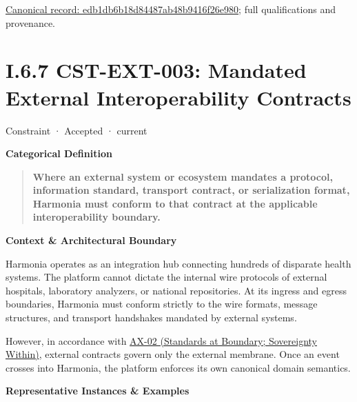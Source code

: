 {\footnotesize \href{../../../../continuum/motivation/constraint/edb1db6b18d84487ab48b9416f26e980.md}{Canonical record: edb1db6b18d84487ab48b9416f26e980}; full qualifications and provenance.}\par
\section*{I.6.7 CST-EXT-003: Mandated External Interoperability Contracts}
\label{navigation:I.6.7}

\label{element:cad6d41364ef4bb1ae0a2a519db11da4}
{\small Constraint · Accepted · current}\par

\par\medskip\textbf{Categorical Definition}\par


\begin{quote}


\textbf{Where an external system or ecosystem mandates a protocol, information standard, transport contract, or serialization format, Harmonia must conform to that contract at the applicable interoperability boundary.}



\end{quote}


\par\medskip\textbf{Context \& Architectural Boundary}\par


Harmonia operates as an integration hub connecting hundreds of disparate health systems. The platform cannot dictate the internal wire protocols of external hospitals, laboratory analyzers, or national repositories. At its ingress and egress boundaries, Harmonia must conform strictly to the wire formats, message structures, and transport handshakes mandated by external systems.



However, in accordance with \hyperref[element:eee8c3783d964d18a7f9dcea85fcd4cf]{AX-02 (Standards at Boundary; Sovereignty Within)}, external contracts govern only the external membrane. Once an event crosses into Harmonia, the platform enforces its own canonical domain semantics.



\par\medskip\textbf{Representative Instances \& Examples}\par



